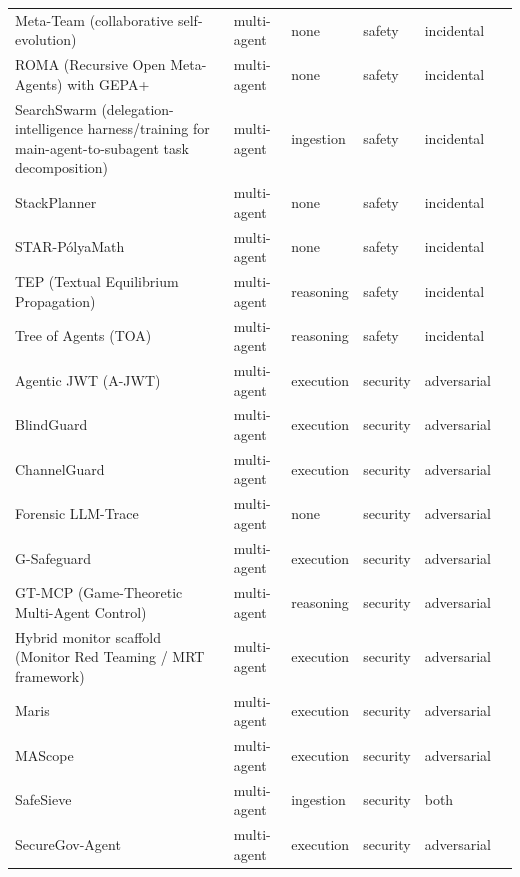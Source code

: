 \begin{longtable}{@{}p{}lllll@{}}
Meta-Team (collaborative self-evolution) & multi-agent & none & safety & incidental & \cite{hao-2026-evolve} \\
ROMA (Recursive Open Meta-Agents) with GEPA+ & multi-agent & none & safety & incidental & \cite{alzubi-2026-roma} \\
SearchSwarm (delegation-intelligence harness/training for main-agent-to-subagent task decomposition) & multi-agent & ingestion & safety & incidental & \cite{ning-2026-searchswarm} \\
StackPlanner & multi-agent & none & safety & incidental & \cite{zhang-2026-stackplanner} \\
STAR-PólyaMath & multi-agent & none & safety & incidental & \cite{wu-2026-starp} \\
TEP (Textual Equilibrium Propagation) & multi-agent & reasoning & safety & incidental & \cite{chen-2026-textual} \\
Tree of Agents (TOA) & multi-agent & reasoning & safety & incidental & \cite{yu-2025-tree} \\
Agentic JWT (A-JWT) & multi-agent & execution & security & adversarial & \cite{goswami-2025-agentic} \\
BlindGuard & multi-agent & execution & security & adversarial & \cite{miao-2025-blindguard} \\
ChannelGuard & multi-agent & execution & security & adversarial & \cite{hossain-2026-channelguard} \\
Forensic LLM-Trace & multi-agent & none & security & adversarial & \cite{s-2026-forensic} \\
G-Safeguard & multi-agent & execution & security & adversarial & \cite{wang-2025-gsafeguard} \\
GT-MCP (Game-Theoretic Multi-Agent Control) & multi-agent & reasoning & security & adversarial & \cite{jamshidi-2026-gametheoretic} \\
Hybrid monitor scaffold (Monitor Red Teaming / MRT framework) & multi-agent & execution & security & adversarial & \cite{kale-2025-reliable} \\
Maris & multi-agent & execution & security & adversarial & \cite{cui-2025-maris} \\
MAScope & multi-agent & execution & security & adversarial & \cite{wei-2026-input} \\
SafeSieve & multi-agent & ingestion & security & both & \cite{zhang-2025-safesieve} \\
SecureGov-Agent & multi-agent & execution & security & adversarial & \cite{chen-2025-securegovagent} \\

\end{longtable}
